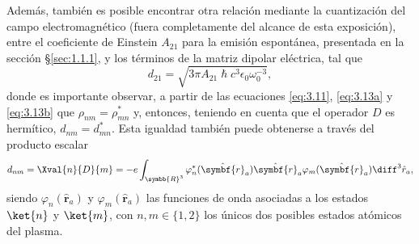 Además, también es posible encontrar otra relación mediante la cuantización del campo electromagnético \autocite{Cohen-Tannoudji2019b} (fuera completamente del alcance de esta exposición), entre el coeficiente de Einstein $A_{21}$ para la emisión espontánea, presentada en la sección \S\ref{sec:1.1.1}, y los términos de la matriz dipolar eléctrica, tal que 
\begin{equation}\label{eq:3.14}
  d_{21} = \sqrt{3 \pi A_{21} \hslash c^{3} \epsilon_{0}\omega^{-3}_{0}}, 
\end{equation}
donde es importante observar, a partir de las ecuaciones \eqref{eq:3.11}, \eqref{eq:3.13a} y \eqref{eq:3.13b} que $\rho_{nm} = \rho^{*}_{mn}$ y, entonces, teniendo en cuenta que el operador $D$ es hermítico, $d_{nm} = d^{*}_{mn}$. Esta igualdad también puede obtenerse a través del producto escalar 
\begin{equation}\label{eq:3.15}
d_{nm} = \Xval{n}{D}{m} = -e \int_{\symbb{R}^{3}} \varphi^{*}_{n}(\hat{\symbf{r}}_{a}) \hat{\symbf{r}}_{a} \varphi_{m}(\hat{\symbf{r}}_{a}) \diff^{3}\hat{r}_{a},
\end{equation}
siendo $\varphi_{n}(\hat{\symbf{r}}_{a})$ y $\varphi_{m}(\hat{\symbf{r}}_{a})$ las funciones de onda asociadas a los estados $\ket{n}$ y $\ket{m}$, con $n, m \in \{1,2\}$ los únicos dos posibles estados atómicos del plasma. 

